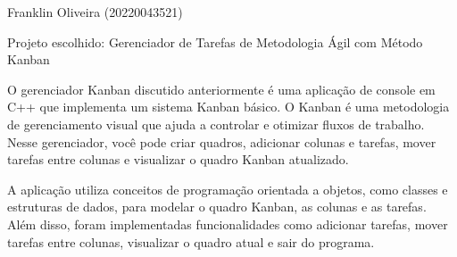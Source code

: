 Franklin Oliveira (20220043521)

Projeto escolhido\+: Gerenciador de Tarefas de Metodologia Ágil com Método Kanban

O gerenciador Kanban discutido anteriormente é uma aplicação de console em C++ que implementa um sistema Kanban básico. O Kanban é uma metodologia de gerenciamento visual que ajuda a controlar e otimizar fluxos de trabalho. Nesse gerenciador, você pode criar quadros, adicionar colunas e tarefas, mover tarefas entre colunas e visualizar o quadro Kanban atualizado.

A aplicação utiliza conceitos de programação orientada a objetos, como classes e estruturas de dados, para modelar o quadro Kanban, as colunas e as tarefas. Além disso, foram implementadas funcionalidades como adicionar tarefas, mover tarefas entre colunas, visualizar o quadro atual e sair do programa. 
